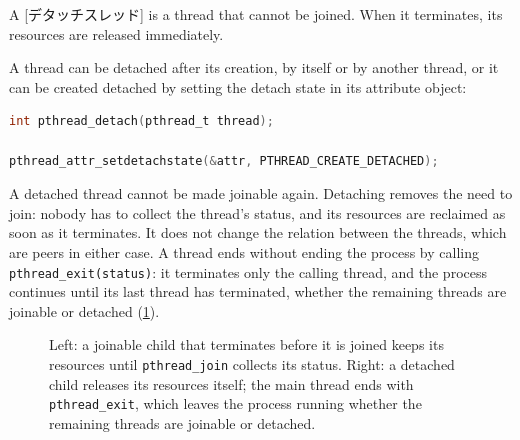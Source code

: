 \documentclass[../main.tex]{subfiles}
\begin{document}
\begin{definition}
  A [デタッチスレッド] is a thread that cannot be
  joined.  When it terminates, its resources are released immediately.
\end{definition}

A thread can be detached after its creation, by itself or by another
thread, or it can be created detached by setting the detach state in its
attribute object:
\begin{lstlisting}[language=C, numbers=none]
int pthread_detach(pthread_t thread);

pthread_attr_setdetachstate(&attr, PTHREAD_CREATE_DETACHED);
\end{lstlisting}
A detached thread cannot be made joinable again.  Detaching removes the
need to join: nobody has to collect the thread's status, and its resources
are reclaimed as soon as it terminates.  It does not change the
relation between the threads, which are peers in either case.  A thread
ends without ending the process by calling \texttt{pthread\_exit(status)}:
it terminates only the calling thread, and the process continues until its
last thread has terminated, whether the remaining threads are joinable or
detached (\cref{fig:l04-join-detach}).

\begin{figure}[htbp]
  \centering
  
  \caption{Left: a joinable child that terminates before it is joined keeps
    its resources until \texttt{pthread\_join} collects its status.  Right:
    a detached child releases its resources itself; the main thread ends
    with \texttt{pthread\_exit}, which leaves the process running whether
    the remaining threads are joinable or detached.}
  \label{fig:l04-join-detach}
\end{figure}
\end{document}
